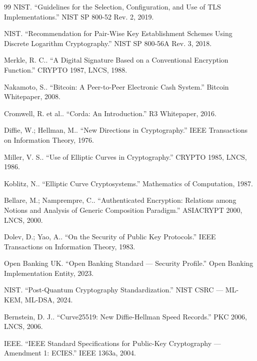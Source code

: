 \begin{thebibliography}{99}
\label{ref:28}
NIST. ``Guidelines for the Selection, Configuration, and Use of TLS Implementations.'' NIST SP 800-52 Rev. 2, 2019.

\label{ref:29}
NIST. ``Recommendation for Pair-Wise Key Establishment Schemes Using Discrete Logarithm Cryptography.'' NIST SP 800-56A Rev. 3, 2018.

\label{ref:30}
Merkle, R. C.. ``A Digital Signature Based on a Conventional Encryption Function.'' CRYPTO 1987, LNCS, 1988.

\label{ref:31}
Nakamoto, S.. ``Bitcoin: A Peer-to-Peer Electronic Cash System.'' Bitcoin Whitepaper, 2008.

\label{ref:32}
Cromwell, R. et al.. ``Corda: An Introduction.'' R3 Whitepaper, 2016.

\label{ref:33}
Diffie, W.; Hellman, M.. ``New Directions in Cryptography.'' IEEE Transactions on Information Theory, 1976.

\label{ref:34}
Miller, V. S.. ``Use of Elliptic Curves in Cryptography.'' CRYPTO 1985, LNCS, 1986.

\label{ref:35}
Koblitz, N.. ``Elliptic Curve Cryptosystems.'' Mathematics of Computation, 1987.

\label{ref:36}
Bellare, M.; Namprempre, C.. ``Authenticated Encryption: Relations among Notions and Analysis of Generic Composition Paradigm.'' ASIACRYPT 2000, LNCS, 2000.

\label{ref:37}
Dolev, D.; Yao, A.. ``On the Security of Public Key Protocols.'' IEEE Transactions on Information Theory, 1983.

\label{ref:38}
Open Banking UK. ``Open Banking Standard --- Security Profile.'' Open Banking Implementation Entity, 2023.

\label{ref:39}
NIST. ``Post-Quantum Cryptography Standardization.'' NIST CSRC --- ML-KEM, ML-DSA, 2024.

\label{ref:40}
Bernstein, D. J.. ``Curve25519: New Diffie-Hellman Speed Records.'' PKC 2006, LNCS, 2006.

\label{ref:41}
IEEE. ``IEEE Standard Specifications for Public-Key Cryptography --- Amendment 1: ECIES.'' IEEE 1363a, 2004.


\end{thebibliography}
